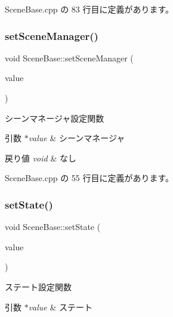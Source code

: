  Scene\+Base.\+cpp の 83 行目に定義があります。

\mbox{\label{class_scene_base_aae1930cae97c27ee7d54b4bd8896a515}} 
\subsubsection{\texorpdfstring{set\+Scene\+Manager()}{setSceneManager()}}
{\footnotesize\ttfamily void Scene\+Base\+::set\+Scene\+Manager (\begin{DoxyParamCaption}\item[{\mbox{\hyperlink{class_scene_manager}{Scene\+Manager}} $\ast$}]{value }\end{DoxyParamCaption})}



シーンマネージャ設定関数 


\begin{DoxyParams}{引数}
{\em $\ast$value} & シーンマネージャ \\
\hline
\end{DoxyParams}

\begin{DoxyRetVals}{戻り値}
{\em void} & なし \\
\hline
\end{DoxyRetVals}


 Scene\+Base.\+cpp の 55 行目に定義があります。

\mbox{\label{class_scene_base_a95d33774db6a05cf1e9da201720ea3db}} 
\subsubsection{\texorpdfstring{set\+State()}{setState()}}
{\footnotesize\ttfamily void Scene\+Base\+::set\+State (\begin{DoxyParamCaption}\item[{\mbox{\hyperlink{class_scene_base_1_1_state_base}{State\+Base}} $\ast$}]{value }\end{DoxyParamCaption})}



ステート設定関数 


\begin{DoxyParams}{引数}
{\em $\ast$value} & ステート \\
\hline
\end{DoxyParams}

